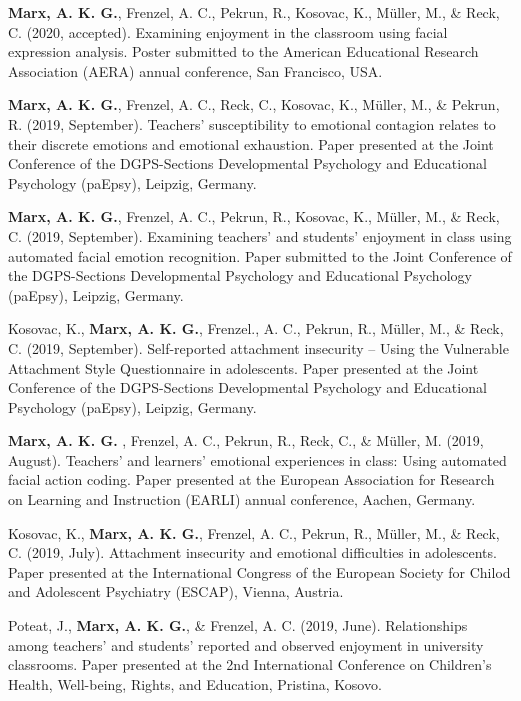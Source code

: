 \documentclass[letterpaper]{article}
\renewenvironment{itemize}{ %
  \begin{list}{}{ %
    \setlength{\leftmargin}{2.5em} %
  }
}{
  \end{list}
}
\begin{document}
\begin{itemize}
\item {\bf Marx, A. K. G.}, Frenzel, A. C., Pekrun, R., Kosovac, K., Müller, M., \& Reck, C. (2020, accepted). Examining enjoyment in the classroom using facial expression analysis. Poster submitted to the American Educational Research Association (AERA) annual conference, San Francisco, USA.
\item {\bf Marx, A. K. G.}, Frenzel, A. C., Reck, C., Kosovac, K., Müller, M., \& Pekrun, R. (2019, September). Teachers’ susceptibility to emotional contagion relates to their discrete emotions and emotional exhaustion. Paper presented at the Joint Conference of the DGPS-Sections Developmental Psychology and Educational Psychology (paEpsy), Leipzig, Germany.
\item {\bf Marx, A. K. G.}, Frenzel, A. C., Pekrun, R., Kosovac, K., Müller, M., \& Reck, C. (2019, September). Examining teachers’ and students’ enjoyment in class using automated facial emotion recognition. Paper submitted to the Joint Conference of the DGPS-Sections Developmental Psychology and Educational Psychology (paEpsy), Leipzig, Germany.
\item Kosovac, K., {\bf Marx, A. K. G.}, Frenzel., A. C., Pekrun, R., Müller, M., \& Reck, C. (2019, September). Self-reported attachment insecurity – Using the Vulnerable Attachment Style Questionnaire in adolescents. Paper presented at the Joint Conference of the DGPS-Sections Developmental Psychology and Educational Psychology (paEpsy), Leipzig, Germany.
\item {\bf Marx, A. K. G. }, Frenzel, A. C., Pekrun, R., Reck, C., \& Müller, M. (2019, August). Teachers’ and learners’ emotional experiences in class: Using automated facial action coding. Paper presented at the European Association for Research on Learning and Instruction (EARLI) annual conference, Aachen, Germany.
\item Kosovac, K., {\bf Marx, A. K. G.}, Frenzel, A. C., Pekrun, R., Müller, M., \& Reck, C. (2019, July). Attachment insecurity and emotional difficulties in adolescents. Paper presented at the International Congress of the European Society for Chilod and Adolescent Psychiatry (ESCAP), Vienna, Austria.
\item Poteat, J., {\bf Marx, A. K. G.}, \& Frenzel, A. C. (2019, June). Relationships among teachers' and students' reported and observed enjoyment in university classrooms. Paper presented at the 2nd International Conference on Children's Health, Well-being, Rights, and Education, Pristina, Kosovo.

\end{itemize}
\end{document}
